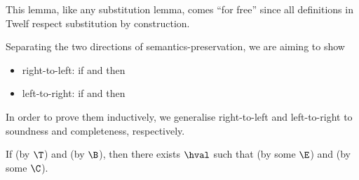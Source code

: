 \Twelf
This lemma, like any substitution lemma, comes ``for free'' since all definitions in Twelf respect substitution by construction.

\vspace{0.5cm}

\noindent Separating the two directions of semantics-preservation, we are aiming to show
\begin{itemize}
	\item[]right-to-left: if \trahb{\benv}{\envnil}{\bexp}{\hexp} and \bev{\envnil}{\bexp}{\n{\nat}} then \hev{\hexp}{\n{\nat}}
	\item[]left-to-right: if \trahb{\benv}{\envnil}{\bexp}{\hexp} and \hev{\hexp}{\n{\nat}} then \bev{\envnil}{\bexp}{\n{\nat}}
\end{itemize}
In order to prove them inductively, we generalise right-to-left and left-to-right to soundness and completeness, respectively.

\begin{lemma}[Soundness]
\label{lem:soundness-hb}
If \trahb{\benv}{\envnil}{\hexp}{\bexp} (by $\T$) and \bev{\benv}{\bexp}{\bval} (by $\B$), then there exists $\hval$ such that \hev{\hexp}{\hval} (by some $\E$) and \corhb{\benv}{\bval}{\hval} (by some $\C$).
\end{lemma}


